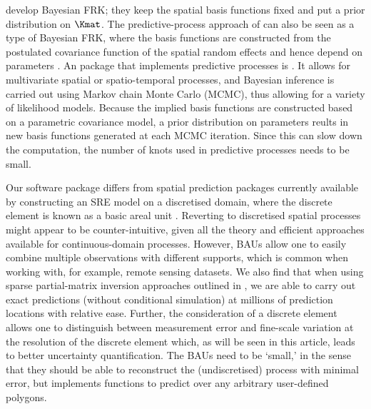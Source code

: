\cite{Kang_2011} develop Bayesian FRK; they keep the spatial basis functions fixed and put a prior distribution on $\Kmat$. The predictive-process approach of \citet{Banerjee_2008} can also be seen as a type of Bayesian FRK, where the basis functions are constructed from the postulated covariance function of the spatial random effects and hence depend on parameters \citep[see][for an equivalence argument]{Katzfuss_2014}. An  package that implements predictive processes is  \citep{Finley_2007}. It allows for multivariate spatial or spatio-temporal processes, and Bayesian inference is carried out using Markov chain Monte Carlo (MCMC), thus allowing for a variety of likelihood models. Because the implied basis functions are constructed based on a parametric covariance model, a prior distribution on parameters reults in new basis functions generated at each MCMC iteration. Since this can slow down the computation, the number of knots used in predictive processes needs to be small.

Our software package  differs from spatial prediction packages currently available by constructing an SRE model on a discretised domain, where the discrete element is known as a basic areal unit \citep[BAU; see, e.g.,][]{Nguyen_2012}. Reverting to discretised spatial processes might appear to be counter-intuitive, given all the theory and efficient approaches available for continuous-domain processes. However, BAUs allow one to easily combine multiple observations with different supports, which is common when working with, for example, remote sensing datasets. We also find that when using sparse partial-matrix inversion approaches outlined in \citet{Takahashi_1973}, we are able to carry out exact predictions (without conditional simulation) at millions of prediction locations with relative ease. Further, the consideration of a discrete element allows one to distinguish between measurement error and fine-scale variation at the resolution of the discrete element which, as will be seen in this article, leads to better uncertainty quantification. The BAUs need to be `small,' in the sense that they should be able to reconstruct the (undiscretised) process with minimal error, but  implements functions to predict over any arbitrary user-defined polygons.

